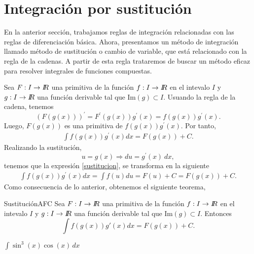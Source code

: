  

\section{Integraci\'on por sustituci\'on}
 En la anterior secci\'on, trabajamos reglas de integraci\'on  relacionadas con las reglas de diferenciaci\'on b\'asica. Ahora, presentamos un m\'etodo de integraci\'on llamado m\'etodo de sustituci\'on o cambio de variable, que est\'a relacionado con la regla de la cadenas. A partir de esta regla trataremos de buscar un m\'etodo eficaz para resolver integrales de funciones compuestas.

 Sea $F:I\rightarrow I\!\! R$ una primitiva de la funci\'on $f:I\rightarrow I\!\! R$ en el intevalo  $I$ y $g:I\rightarrow I\!\! R$ una funci\'on derivable tal que $\mbox{Im}(g) \subset I$. Usuando la regla de la cadena, tenemos
$$(F(g(x)))^{\prime}=F^{\prime}(g(x))g^{\prime}(x)=f(g(x))g^{\prime}(x).$$
Luego, $F(g(x))$ es una primitiva de $f(g(x))g^{\prime}(x)$. Por tanto,
\begin{align} \label{sustitucion} 
 \int f(g(x))g^{\prime}(x) dx= F(g(x))+ C. 
\end{align}
Realizando la sustituci\'on, 
$$ u=g(x) \Rightarrow du=g^{\prime}(x)\ dx, $$
tenemos que la expresi\'on \eqref{sustitucion}, se transforma en la siguiente 
\begin{align*}
 \int f(g(x))  g^{\prime}(x)dx= \int f(u)du = F(u) + C =F(g(x))+C.
\end{align*}
Como consecuencia de lo anterior, obtenemos el siguiente teorema, 
\begin{teorema}{Sustituci\'on}{AFC}\label{teo-regla-cadena-int}
Sea $F:I\rightarrow I\!\! R$ una primitiva de la funci\'on $f:I\rightarrow I\!\! R$ en el intevalo  $I$ y $g:I\rightarrow I\!\! R$ una funci\'on derivable tal que $\mbox{Im}(g) \subset I$. Entonces $$\int f(g(x))g'(x)dx = F(g(x))+C.$$
\end{teorema}
\begin{Ejemplo} $\displaystyle\int \sin^{3}(x)\cos(x)\,dx$
\end{Ejemplo}
